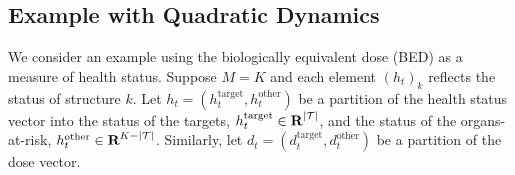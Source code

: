 \documentclass[12pt]{article}
\newcounter{algorithmctr}[section]
\renewcommand{\thealgorithmctr}{\thesection.\arabic{algorithmctr}}
\newenvironment{algdesc}%
{\refstepcounter{algorithmctr}\begin{list}{}{%
			\setlength{\rightmargin}{0\linewidth}%
			\setlength{\leftmargin}{.05\linewidth}}%
		\rmfamily\small
		\item[]{\setlength{\parskip}{0ex}\hrulefill\par%
			\nopagebreak{\bfseries\textsf{Algorithm \thealgorithmctr~}}}}%
	{{\setlength{\parskip}{-1ex}\nopagebreak\par\hrulefill} \end{list}}
\begin{document}

\subsection{Example with Quadratic Dynamics}
\label{sec:bed_ex}
We consider an example using the biologically equivalent dose (BED) as a measure of health status. Suppose $M = K$ and each element $(h_t)_k$ reflects the status of structure $k$. Let $h_t = (h_t^{\text{target}}, h_t^{\text{other}})$ be a partition of the health status vector into the status of the targets, $h_t^{\text{target}} \in {\mbox{\bf R}}^{|\mathcal{T}|}$, and the status of the organs-at-risk, $h_t^{\text{other}} \in {\mbox{\bf R}}^{K-|\mathcal{T}|}$. Similarly, let $d_t = (d_t^{\text{target}}, d_t^{\text{other}})$ be a partition of the dose vector.
\end{document}
